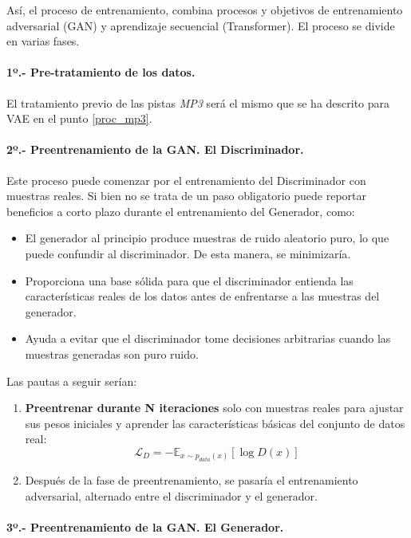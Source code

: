 Así, el proceso de entrenamiento, combina procesos y objetivos de entrenamiento adversarial (GAN) y aprendizaje secuencial (Transformer). El proceso se divide en varias fases.

\paragraph{1º.- Pre-tratamiento de los datos.} 

El tratamiento previo de las pistas \emph{MP3} será el mismo que se ha descrito para VAE en el punto \ref{proc_mp3}.

\paragraph{2º.- Preentrenamiento de la GAN. El Discriminador.} 

Este proceso puede comenzar por el entrenamiento del Discriminador con muestras reales. Si bien no se trata de un paso obligatorio puede reportar beneficios a corto plazo durante el entrenamiento del Generador, como:

\begin{itemize}
    \item El generador al principio produce muestras de ruido aleatorio puro, lo que puede confundir al discriminador. De esta manera, se minimizaría.
    \item Proporciona una base sólida para que el discriminador entienda las características reales de los datos antes de enfrentarse a las muestras del generador.
    \item Ayuda a evitar que el discriminador tome decisiones arbitrarias cuando las muestras generadas son puro ruido.
\end{itemize}

Las pautas a seguir serían:
\begin{enumerate}
    \item \textbf{Preentrenar durante N iteraciones} solo con muestras reales para ajustar sus pesos iniciales y aprender las características básicas del conjunto de datos real:
    \[
    \mathcal{L}_{D} = -\mathbb{E}_{x \sim p_{data}(x)}[\log D(x)]
    \]
    \item Después de la fase de preentrenamiento, se pasaría el entrenamiento adversarial, alternado entre el discriminador y el generador.
\end{enumerate}

\paragraph{3º.- Preentrenamiento de la GAN. El Generador.} 


